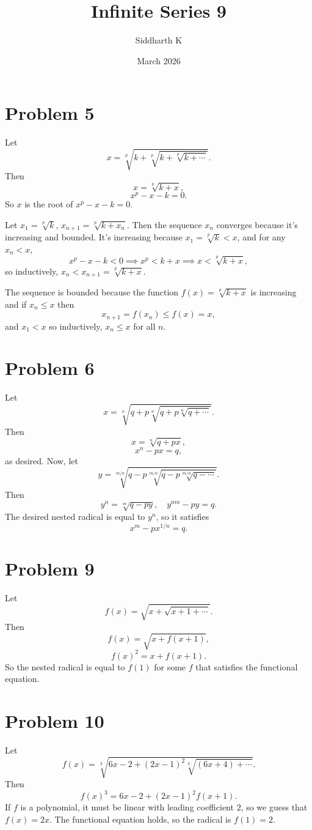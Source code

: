 \documentclass{article}
\title{Infinite Series 9}
\author{Siddharth K}
\date{March 2026}
\begin{document}
\maketitle

\section*{Problem 5}
Let
$$x = \sqrt[p]{k + \sqrt[p]{k + \sqrt[p]{k + \cdots}}}.$$
Then
$$x = \sqrt[p]{k + x},$$
$$x^p - x - k = 0.$$
So $x$ is the root of $x^p - x - k = 0$.

Let $x_1 = \sqrt[p]{k}$, $x_{n + 1} = \sqrt[p]{k + x_n}$. Then the sequence $x_n$ converges because it's increasing and bounded. It's increasing because
$x_1 = \sqrt[p]{k} < x$, and for any $x_n < x$,
$$x^p - x - k < 0 \implies x^p < k + x \implies x < \sqrt[p]{k + x},$$
so inductively, $x_n < x_{n + 1} = \sqrt[p]{k + x}$.

The sequence is bounded because the function $f(x) = \sqrt[p]{k + x}$ is increasing and if $x_n \le x$ then
$$x_{n + 1} = f(x_n) \le f(x) = x,$$
and $x_1 < x$ so inductively, $x_n \le x$ for all $n$.

\section*{Problem 6}
Let
$$x = \sqrt[n]{q + p\sqrt[n]{q + p\sqrt[n]{q + \cdots}}}.$$
Then
$$x = \sqrt[n]{q + px},$$
$$x^n - px = q,$$
as desired. Now, let
$$y = \sqrt[m/n]{q - p\sqrt[m/n]{q - p\sqrt[m/n]{q - \cdots}}}.$$
Then
$$y^n = \sqrt[m]{q - py}, \quad y^{nm} - py = q.$$
The desired nested radical is equal to $y^n$, so it satisfies
$$x^m - px^{1/n} = q.$$

\section*{Problem 9}
Let
$$f(x) = \sqrt{x + \sqrt{x + 1 + \cdots}}.$$
Then
$$f(x) = \sqrt{x + f(x + 1)},$$
$$f(x)^2 = x + f(x + 1).$$
So the nested radical is equal to $f(1)$ for some $f$ that satisfies the functional equation.

\section*{Problem 10}
Let
$$f(x) = \sqrt[3]{6x - 2 + (2x - 1)^2 \sqrt[3]{(6x + 4) + \cdots}}.$$
Then
$$f(x)^3 = 6x - 2 + (2x - 1)^2f(x + 1).$$
If $f$ is a polynomial, it must be linear with leading coefficient $2$, so we guess that $f(x) = 2x$. The functional equation holds, so the radical is $f(1) = 2$.
\end{document}
